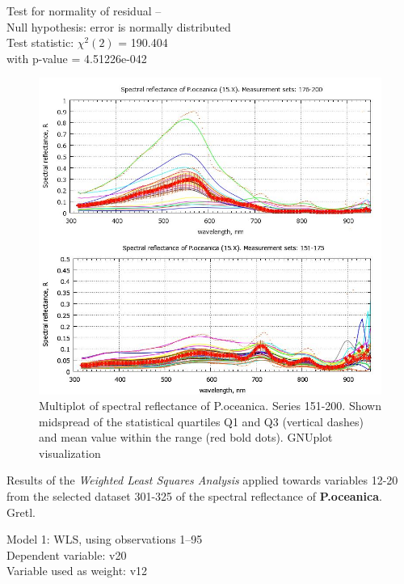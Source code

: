 \documentclass[10pt, a4paper]{article}
\begin{document}
\begin{appendices}
\begin{table}[H]
\begin{center}
\vspace{1em}
\begin{raggedright}
Test for normality of residual --\\
\quad Null hypothesis: error is normally distributed\\
\quad Test statistic: $\chi^2(2)$ = 190.404\\
\quad with p-value = 4.51226e-042\\
\vspace{1ex}
\end{raggedright}
\end{center}
\end{table}
\begin{figure}[H]
\begin{center}
\includegraphics[scale=0.38]{GNU-15.jpg}
\caption{Multiplot of spectral reflectance of P.oceanica. Series 151-200. Shown midspread of the statistical quartiles Q1 and Q3 (vertical dashes) and
mean value within the range (red bold dots). GNUplot visualization­}
\label{fig:57}
\end{center}
\end{figure}
\pagebreak

\begin{table}[H]
\begin{center}
\caption{Results of the \textit{Weighted Least Squares Analysis} applied towards variables 12-20 from the selected dataset 301-325 of the spectral reflectance of \textbf{P.oceanica}. Gretl.}
Model 1: WLS, using observations 1--95\\
Dependent variable: v20\\
Variable used as weight: v12


\end{center}
\end{table}
\end{appendices}
\end{document}
